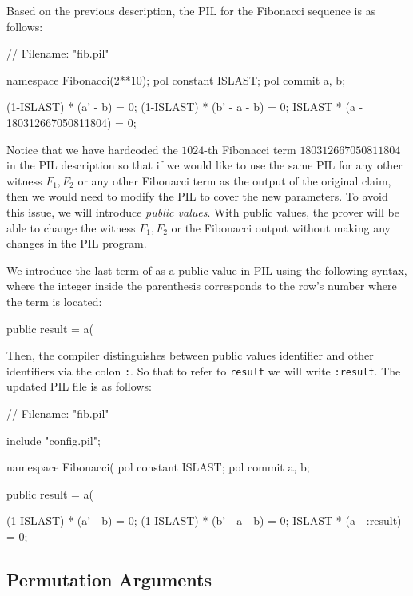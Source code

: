 Based on the previous description, the PIL for the Fibonacci sequence is as follows:
\begin{pil}
// Filename: "fib.pil"

namespace Fibonacci(2**10);
    pol constant ISLAST;   
    pol commit a, b;

    (1-ISLAST) * (a' - b) = 0;
    (1-ISLAST) * (b' - a - b) = 0;
    ISLAST * (a - 180312667050811804) = 0; 
\end{pil}
Notice that we have hardcoded the $1024$-th Fibonacci term $180312667050811804$ in the PIL description so that if we would like to use the same PIL for any other witness $F_1,F_2$ or any other Fibonacci term as the output of the original claim, then we would need to modify the PIL to cover the new parameters. To avoid this issue, we will introduce \textit{public values}. With public values, the prover will be able to change the witness $F_1,F_2$ or the Fibonacci output without making any changes in the PIL program.

We introduce the last term of \att as a public value in PIL using the following syntax, where the integer inside the parenthesis corresponds to the row's number where the term is located:
\begin{pil}
public result = a(%
\end{pil}
Then, the compiler distinguishes between public values identifier and other identifiers via the colon \texttt{:}. So that to refer to \texttt{result} we will write \texttt{:result}. The updated PIL file is as follows:
\begin{pil}
// Filename: "fib.pil"

include "config.pil";

namespace Fibonacci(%
    pol constant ISLAST;   
    pol commit a, b;

    public result = a(%

    (1-ISLAST) * (a' - b) = 0;
    (1-ISLAST) * (b' - a - b) = 0;
    ISLAST * (a - :result) = 0; 
\end{pil}


\subsection{Permutation Arguments} \label{sec:permutation-arguments}

